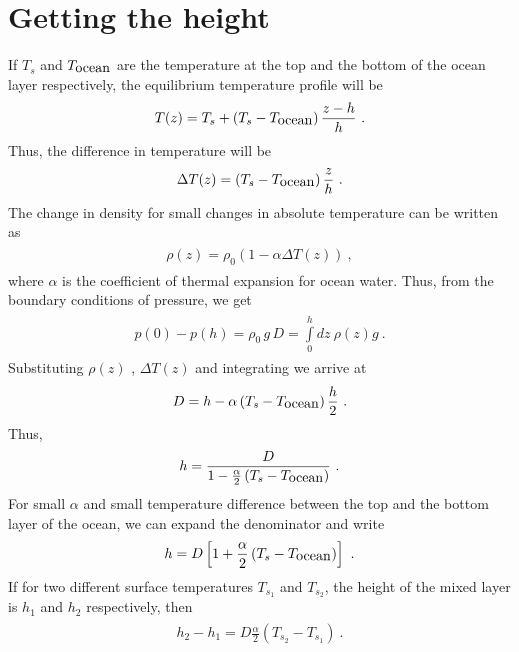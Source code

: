 \documentclass[fontsize = 13pt]{scrartcl}
\begin{document}
\section{Getting the height}
If \(T_s\) and \(T_{\mbox{ocean}}\) are the temperature at the top and the bottom of the ocean layer respectively, the equilibrium temperature profile will be
\begin{align}
\begin{split}
    T(z) = T_s + \left( T_s - T_{\mbox{ocean}} \right)\frac{z -h}{h} \ .
\end{split}
\end{align}
Thus, the difference in temperature will be 
\begin{align}
\begin{split}
    \Delta T (z) = \left( T_s - T_{\mbox{ocean}} \right)\frac{z}{h} \ .
\end{split}
\end{align}
The change in density for small changes in absolute temperature can be written as
\begin{align}
\begin{split}
    \rho(z) = \rho_0 \left( 1 -\alpha \Delta T(z) \right) \ ,
\end{split}
\end{align}
where \(\alpha\) is the coefficient of thermal expansion for ocean water. Thus, from the boundary conditions of pressure, we get
\begin{align}
\begin{split}
    p(0) - p(h) =    \rho_0\,g\,D  = \int\limits_{0}^{h} dz\  \rho(z) g  \ . 
\end{split}
\end{align}
Substituting $\rho(z)$ , $\Delta T(z)$ and integrating we arrive at
\begin{align}
\begin{split}
    D = h - \alpha \left( T_s - T_{\mbox{ocean}} \right)\frac{h}{2} \ .
\end{split}
\end{align}
Thus, 
\begin{align}
\begin{split}
    h = \frac{D}{1 - \frac{\alpha}{2} \left( T_s - T_{\mbox{ocean}} \right)} \ .
\end{split}
\end{align}
For small \(\alpha \) and small temperature difference between the top and the bottom layer of the ocean, we can expand the denominator and write
\begin{align}
\begin{split}
    h = D\left[ 1 +   \frac{\alpha}{2} \left( T_s - T_{\mbox{ocean}} \right)\right] \ .
\end{split}
\end{align}
If for two different surface temperatures $T_{s_1}$ and $T_{s_2}$, the height of the mixed layer is $h_1$ and $h_2$ respectively, then 
\begin{align}
\begin{split}
    h_2 - h_1 =D \frac{\alpha}{2} \left( T_{s_2} -  T_{s_1} \right) \ .
\end{split}
\end{align}
\end{document}

